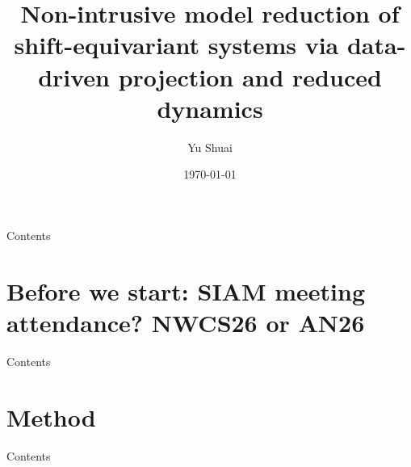 \documentclass[presentation]{beamer}
\author{Yu Shuai}
\date{\today}
\title{Non-intrusive model reduction of shift-equivariant systems via data-driven projection and reduced dynamics}
\begin{document}
\maketitle
\begin{frame}{Contents}
\tableofcontents[hideallsubsections]
\end{frame}

\section{Before we start: SIAM meeting attendance? NWCS26 or AN26}
\label{sec:org2b20211}
\begin{frame}{Contents}
\end{frame}


\section{Method}
\label{sec:orgaef6232}
\begin{frame}{Contents}
\end{frame}
\end{document}

